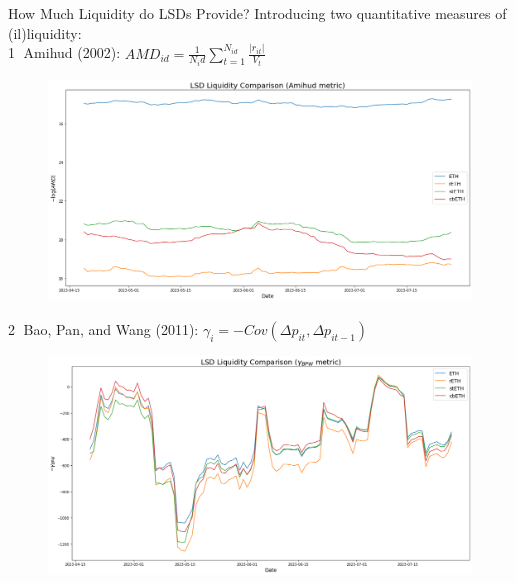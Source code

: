 \documentclass{beamer}
\begin{document}
    

\begin{frame}{How Much Liquidity do LSDs Provide?}
    Introducing two quantitative measures of (il)liquidity:\\
    \textcircled{1} Amihud (2002):
    $AMD_{id} = \frac{1}{N_id}\sum_{t=1}^{N_{id}}\frac{|r_{it}|}{V_t}$
    \begin{figure}
        \centering
        \includegraphics[width=\textwidth]{figures/liq_AMD.png}
    \end{figure}
\end{frame}

\begin{frame}
    \textcircled{2} Bao, Pan, and Wang (2011): $\gamma_i = -Cov(\Delta p_{it}, \Delta p_{it-1})$
    \begin{figure}
        \centering
        \includegraphics[width=\textwidth]{figures/liq_BPW.png}
    \end{figure}
\end{frame}
\end{document}
